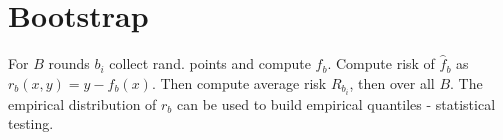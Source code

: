 \section*{Bootstrap}
For $B$ rounds $b_i$ collect rand. points and compute $\hat{f}_b$. Compute risk of $\hat{f}_b$ as $r_b(x,y) = y-\hat{f}_b(x)$. Then compute average risk $R_{b_i}$, then over all $B$.
The empirical distribution of $r_b$ can be used to build empirical quantiles - statistical testing.